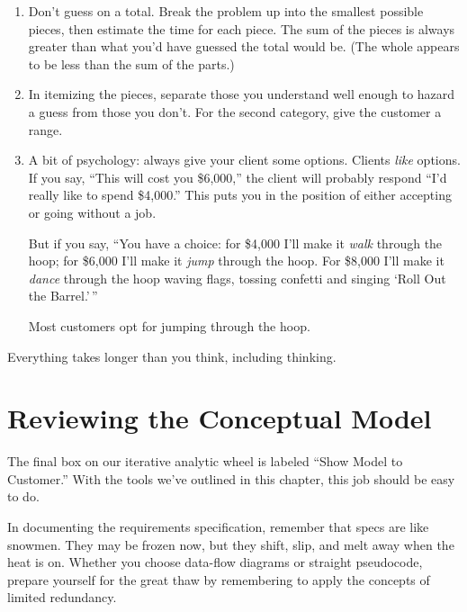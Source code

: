 \begin{enumerate}

\item Don't guess on a total. Break the problem up into the smallest
possible pieces, then estimate the time for each piece. The sum of the
pieces is always greater than what you'd have guessed the total would
be. (The whole appears to be less than the sum of the parts.)

\item In itemizing the pieces, separate those you understand well
enough to hazard a guess from those you don't. For the second
category, give the customer a range.

\item A bit of psychology: always give your client some options.
Clients \emph{like} options. If you say, ``This will cost you \$6,000,''
the client will probably respond ``I'd really like to spend \$4,000.''
This puts you in the position of either accepting or going without a job.

But if you say, ``You have a choice: for \$4,000 I'll make it
\emph{walk} through the hoop; for \$6,000 I'll make it \emph{jump}
through the hoop. For \$8,000 I'll make it \emph{dance} through the
hoop waving flags, tossing confetti and singing `Roll Out the Barrel.'\,''

Most customers opt for jumping through the hoop.
\end{enumerate}

\begin{tip}
Everything takes longer than you think, including thinking.
\end{tip}%
%
%
%

\section{Reviewing the Conceptual Model}%
%

The final box on our iterative analytic wheel is labeled ``Show Model
to Customer.'' With the tools we've outlined in this chapter, this job
should be easy to do.

In documenting the requirements specification, remember that specs are
like snowmen. They may be frozen now, but they shift, slip, and melt
away when the heat is on. Whether you choose data-flow diagrams or
straight \Forth{} pseudocode, prepare yourself for the great thaw by
remembering to apply the concepts of limited redundancy.

